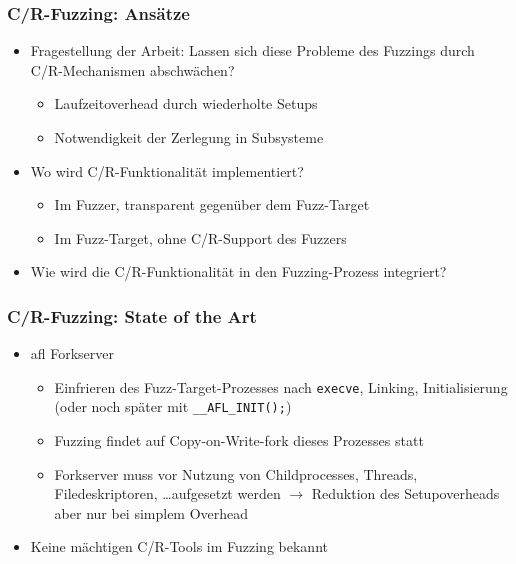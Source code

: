 \documentclass[handout]{beamer}
\begin{document}
\begin{frame}
    \frametitle{C/R-Fuzzing: Ansätze}
    \begin{itemize}
        \item Fragestellung der Arbeit: Lassen sich diese Probleme des Fuzzings durch C/R-Mechanismen abschwächen?
            \begin{itemize}
                \item Laufzeitoverhead durch wiederholte Setups
                \item Notwendigkeit der Zerlegung in Subsysteme
            \end{itemize}
        \item Wo wird C/R-Funktionalität implementiert?
            \begin{itemize}
                \item Im Fuzzer, transparent gegenüber dem Fuzz-Target
                \item Im Fuzz-Target, ohne C/R-Support des Fuzzers
            \end{itemize}
        \item Wie wird die C/R-Funktionalität in den Fuzzing-Prozess integriert?
    \end{itemize}
\end{frame}

\begin{frame}
    \frametitle{C/R-Fuzzing: State of the Art}
    \begin{itemize}
        \item afl Forkserver
            \begin{itemize}
                \item Einfrieren des Fuzz-Target-Prozesses nach \texttt{execve}, Linking, Initialisierung (oder noch später mit \texttt{\_\_AFL\_INIT();})
                \item Fuzzing findet auf Copy-on-Write-fork dieses Prozesses statt
                \item Forkserver muss vor Nutzung von Childprocesses, Threads, Filedeskriptoren, \dots aufgesetzt werden
                    $\rightarrow$ Reduktion des Setupoverheads aber nur bei simplem Overhead
            \end{itemize}
        \item Keine mächtigen C/R-Tools im Fuzzing bekannt
    \end{itemize}
\end{frame}
\end{document}
